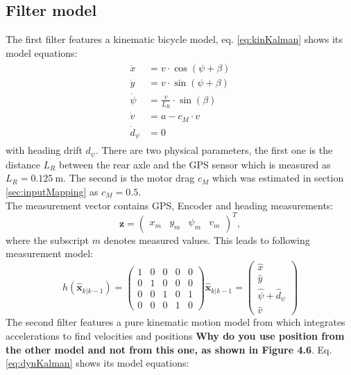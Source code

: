 \subsection{Filter model}
The first filter features a kinematic bicycle model, eq. \ref{eq:kinKalman} shows its model equations:
\begin{align}
\begin{split}\label{eq:kinKalman}
    \dot x &= v \cdot \cos (\psi + \beta)\\
    \dot y &= v \cdot \sin (\psi + \beta)\\
    \dot \psi &= \frac{v}{L_R}\cdot\sin(\beta)\\
    \dot v &= a - c_M\cdot v\\
    \dot d_\psi &= 0
\end{split}
\end{align}
with heading drift $d_\psi$.
There are two physical parameters, the first one is the distance $L_R$ between the rear axle and the GPS sensor which is measured as $L_R=\SI{0.125}{\meter}$. The second is the motor drag $c_M$ which was estimated in section \ref{sec:inputMapping} as $c_M=0.5$.\\
The measurement vector contains GPS, Encoder and heading measurements:
\begin{equation}
\bm{z} = \begin{pmatrix}
x_m&y_m&\psi_m&v_m
\end{pmatrix}^T,
\end{equation}
where the subscript $m$ denotes measured values. This leads to following measurement model:
\begin{equation}
h(\hat{\bm{x}}_{k|k-1}) = \begin{pmatrix}
1 & 0 & 0 & 0 & 0\\
0 & 1 & 0 & 0 & 0\\
0 & 0 & 1 & 0 & 1\\
0 & 0 & 0 & 1 & 0
\end{pmatrix} \hat{\bm{x}}_{k|k-1}=
\begin{pmatrix}
\hat x\\
\hat y\\
\hat \psi + \hat d_\psi\\
\hat v
\end{pmatrix}
\end{equation} 
The second filter features a pure kinematic motion model from \cite{Caron2006} which integrates accelerations to find velocities and positions {\bfseries{Why do you use position from the other model and not from this one, as shown in Figure 4.6}}. Eq. \ref{eq:dynKalman} shows its model equations:
